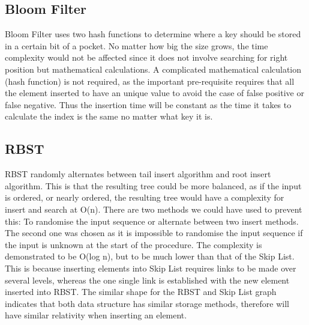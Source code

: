\documentclass[11pt]{article}
\begin{document}
\subsection*{Bloom Filter}
Bloom Filter uses two hash functions to determine where a key should be stored in a certain bit of a pocket. No matter how big the size grows, the time complexity would not be affected since it does not involve searching for right position but mathematical calculations. A complicated mathematical calculation (hash function) is not required, as the important pre-requisite requires that all the element inserted to have an unique value to avoid the case of false positive or false negative. Thus the insertion time will be constant as the time it takes to calculate the index is the same no matter what key it is. 
\subsection*{RBST}
RBST randomly alternates between tail insert algorithm and root insert algorithm. This is that the resulting tree could be more balanced, as if the input is ordered, or nearly ordered, the resulting tree would have a complexity for insert and search at O(n). There are two methods we could have used to prevent this: To randomise the input sequence or alternate between two insert methods. The second one was chosen as it is impossible to randomise the input sequence if the input is unknown at the start of the procedure. The complexity is demonstrated to be O(log n), but to be much lower than that of the Skip List. This is because inserting elements into Skip List requires links to be made over several levels, whereas the one single link is established with the new element inserted into RBST. The similar shape for the RBST and Skip List graph indicates that both data structure has similar storage methods, therefore will have similar relativity when inserting an element. 
\end{document}
